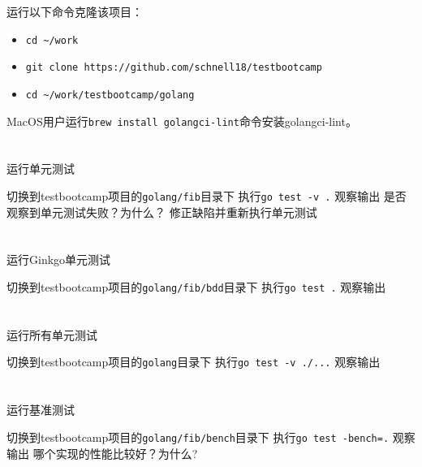 \documentclass[12pt,addpoints,fleqn]{exam}
\begin{document}
\begin{questions}
\begin{parts}
运行以下命令克隆该项目：
\begin{itemize}
    \item \verb=cd ~/work=
    \item \verb=git clone https://github.com/schnell18/testbootcamp=
    \item \verb=cd ~/work/testbootcamp/golang=
\end{itemize}

MacOS用户运行\verb=brew install golangci-lint=命令安装golangci-lint。

  \part{}运行单元测试
  \begin{subparts}
    \subpart{}切换到testbootcamp项目的\verb=golang/fib=目录下
    \subpart{}执行\verb=go test -v .=
    \subpart{}观察输出
    \subpart{}是否观察到单元测试失败？为什么？
    \subpart{}修正缺陷并重新执行单元测试
  \end{subparts}

  \part{}运行Ginkgo单元测试
  \begin{subparts}
    \subpart{}切换到testbootcamp项目的\verb=golang/fib/bdd=目录下
    \subpart{}执行\verb=go test .=
    \subpart{}观察输出
  \end{subparts}

  \part{}运行所有单元测试
  \begin{subparts}
    \subpart{}切换到testbootcamp项目的\verb=golang=目录下
    \subpart{}执行\verb=go test -v ./...=
    \subpart{}观察输出
  \end{subparts}

  \part{}运行基准测试
  \begin{subparts}
    \subpart{}切换到testbootcamp项目的\verb=golang/fib/bench=目录下
    \subpart{}执行\verb#go test -bench=.#
    \subpart{}观察输出
    \subpart{}哪个实现的性能比较好？为什么?
  \end{subparts}


\end{parts}
\end{questions}
\end{document}
